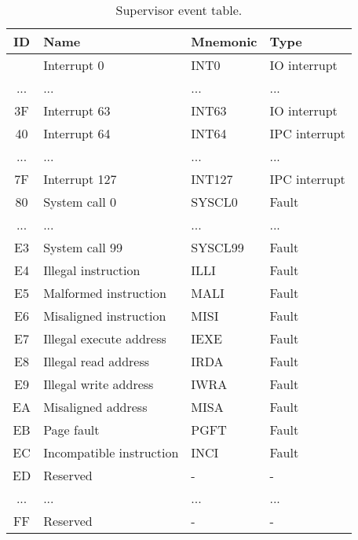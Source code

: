 \begin{table}[hbt!] %

    \begin{center}

    \begin{tabular}{|c|l|l|l|}

        \hline
        ID & Name & Mnemonic & Type \\
        \hline
        \addlinespace[10pt]
        \hline
        00 & Interrupt 0 & INT0 & IO interrupt \\
        \hline
        ... & ... & ... & ... \\
        \hline
        3F & Interrupt 63 & INT63 & IO interrupt \\
        \hline
        40 & Interrupt 64 & INT64 & IPC interrupt \\
        \hline
        ... & ... & ... & ... \\
        \hline
        7F & Interrupt 127 & INT127 & IPC interrupt \\
        \hline
        80 & System call 0 & SYSCL0 & Fault \\
        \hline
        ... & ... & ... & ... \\
        \hline
        E3 & System call 99 & SYSCL99 & Fault \\
        \hline
        E4 & Illegal instruction & ILLI & Fault \\
        \hline
        E5 & Malformed instruction & MALI & Fault \\
        \hline
        E6 & Misaligned instruction & MISI & Fault \\
        \hline
        E7 & Illegal execute address & IEXE & Fault \\
        \hline
        E8 & Illegal read address & IRDA & Fault \\
        \hline
        E9 & Illegal write address & IWRA & Fault \\
        \hline
        EA & Misaligned address & MISA & Fault \\
        \hline
        EB & Page fault & PGFT & Fault \\
        \hline
        EC & Incompatible instruction & INCI & Fault \\
        \hline
        ED & Reserved & - & - \\
        \hline
        ... & ... & ... & ... \\
        \hline
        FF & Reserved & - & - \\
        \hline

    \end{tabular}

    \caption[Supervisor event table]{Supervisor event table.}

    \end{center}

\end{table}